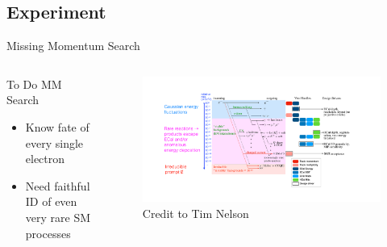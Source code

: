\documentclass[aspectratio=169]{beamer}
\begin{document}
\subsection{Experiment}
\begin{frame}{Missing Momentum Search}
  \begin{columns}
    \begin{column}{0.25\textwidth}
      \begin{block}{To Do MM Search}
        \begin{itemize}
          \item Know fate of every single electron
          \item Need faithful ID of even very rare SM processes
        \end{itemize}
      \end{block}
    \end{column}
    \begin{column}{0.7\textwidth}
      \begin{figure}
        \centering
        \includegraphics[width=\textwidth]{../figures/ldmx/experiment/reaction_staircase_with_designDrivers.pdf}
        \caption{Credit to Tim Nelson}
      \end{figure}
    \end{column}
  \end{columns}
\end{frame}
\end{document}
